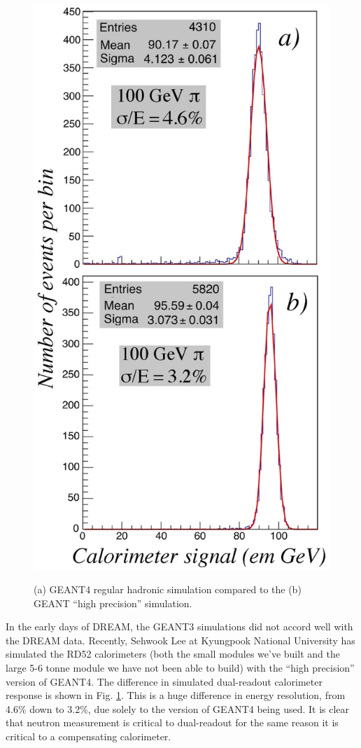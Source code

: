 \begin{figure}
 \centering
 \includegraphics[scale=0.20]{f41-geant.jpg}
 \label{fig:hp}
 \caption{(a) GEANT4 regular hadronic simulation compared to the (b) GEANT ``high precision'' simulation.}
\end{figure}


In the early days of DREAM, the GEANT3 simulations did not accord well with the DREAM data.  Recently, Sehwook Lee
at Kyungpook National University has simulated the RD52 calorimeters (both the small modules we've built and the large
5-6 tonne module we have not been able to build) with the ``high precision'' version of GEANT4.  The difference in simulated dual-readout calorimeter response is shown in Fig. \ref{fig:hp}.  This is a huge difference in energy resolution, from 4.6\% down to 3.2\%, due solely to the version of GEANT4
being used.    It is clear that neutron measurement is critical to 
dual-readout for the same reason it is critical to a compensating calorimeter.



